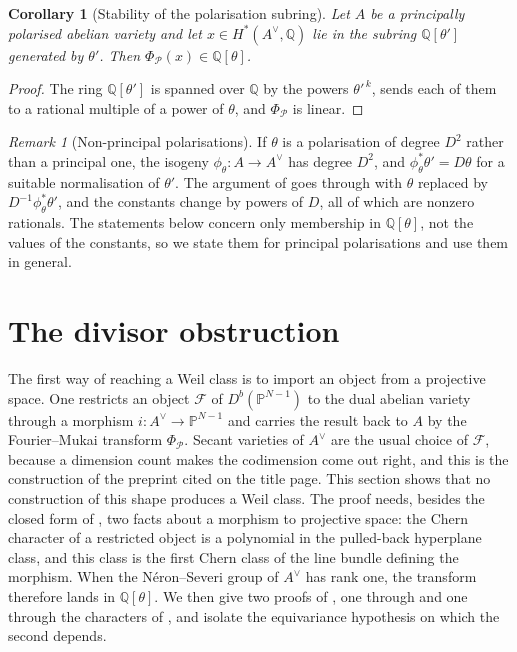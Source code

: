 \documentclass[11pt,reqno]{amsart}
\theoremstyle{plain}
\newtheorem{corollary}[theorem]{Corollary}
\theoremstyle{definition}
\theoremstyle{remark}
\newtheorem{remark}[theorem]{Remark}
\newcommand{\QQ}{\mathbb{Q}}
\newcommand{\PP}{\mathbb{P}}
\newcommand{\Av}{A^{\vee}}
\newcommand{\cP}{\mathcal{P}}
\newcommand{\cF}{\mathcal{F}}
\begin{document}
\begin{corollary}[Stability of the polarisation subring]\label{cor:stability}
Let $A$ be a principally polarised abelian variety and let
$x\in H^{*}(\Av,\QQ)$ lie in the subring $\QQ[\theta']$ generated by $\theta'$.
Then $\Phi_{\cP}(x)\in\QQ[\theta]$.
\end{corollary}

\begin{proof}
The ring $\QQ[\theta']$ is spanned over $\QQ$ by the powers
$\theta'^{\,k}$,  sends each of them to a rational
multiple of a power of $\theta$, and $\Phi_{\cP}$ is linear.
\end{proof}

\begin{remark}[Non-principal polarisations]\label{rem:nonprincipal}
If $\theta$ is a polarisation of degree $D^{2}$ rather than a principal
one, the isogeny $\phi_{\theta}\colon A\to\Av$ has degree $D^{2}$,
and $\phi_{\theta}^{*}\theta'=D\theta$ for a suitable normalisation of
$\theta'$. The argument of  goes through with $\theta$
replaced by $D^{-1}\phi_{\theta}^{*}\theta'$, and the constants change
by powers of $D$, all of which are nonzero rationals. The statements below
concern only membership in $\QQ[\theta]$, not the values of the constants, so
we state them for principal polarisations and use them in general.
\end{remark}
\section{The divisor obstruction}\label{sec:divisor}

The first way of reaching a Weil class is to import an object from a
projective space. One restricts an object $\cF$ of $D^{b}(\PP^{N-1})$ to the
dual abelian variety through a morphism $i\colon\Av\to\PP^{N-1}$ and carries
the result back to $A$ by the Fourier--Mukai transform $\Phi_{\cP}$. Secant
varieties of $\Av$ are the usual choice of $\cF$, because a dimension count
makes the codimension come out right, and this is the construction of the
preprint cited on the title page. This section shows that no construction of
this shape produces a Weil class. The proof needs, besides the closed form of
, two facts about a morphism to projective space: the Chern
character of a restricted object is a polynomial in the pulled-back
hyperplane class, and this class is the first Chern class of the line bundle
defining the morphism. When the N\'eron--Severi group of $\Av$ has rank one,
the transform therefore lands in $\QQ[\theta]$. We then give two proofs of
, one through  and one through the
characters of , and isolate the equivariance hypothesis
on which the second depends.
\end{document}
